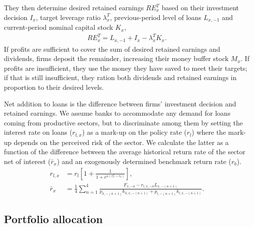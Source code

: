\documentclass[authoryear]{article}
\begin{document}
They then determine desired retained earnings $RE_x^T$ based on their investment decision $I_x$, target leverage ratio $\lambda_x^T$, previous-period level of loans $L_{x,-1}$ and current-period nominal capital stock $K_x$,
\begin{gather}
RE_x^T = L_{x,-1} + I_x - \lambda_x^T K_x.
\end{gather}
If profits are sufficient to cover the sum of desired retained earnings and dividends, firms deposit the remainder, increasing their money buffer stock $M_x$. If profits are insufficient, they use the money they have saved to meet their targets; if that is still insufficient, they ration both dividends and retained earnings in proportion to their desired levels.

Net addition to loans is the difference between firms' investment decision and retained earnings.
We assume banks to accommodate any demand for loans coming from productive sectors, but to discriminate among them by setting the interest rate on loans ($r_{l,x}$) as a mark-up on the policy rate ($r_l$) where the mark-up depends on the perceived risk of the sector. We calculate the latter as a function of the difference between the average historical return rate of the sector net of interest ($\bar{r}_x$) and an exogenously determined benchmark return rate ($r_b$).
\begin{align}
r_{l,x} &= r_l\left[1 + \frac{1}{1 + e^{\kappa(r_x^a - r_b)}} \right], \\
\bar{r}_x&=\frac{1}{4}\sum_{n=1}^{4}\frac{F_{x,-n}-r_{l,x,-n}L_{x,-(n+1)}}{p_{h,-(n+1)}k_{h,x,-(n+1)}+p_{l,-(n+1)} k_{l,x,-(n+1)}}.
\end{align}

\subsection{Portfolio allocation}
\label{sec:port}
\end{document}
